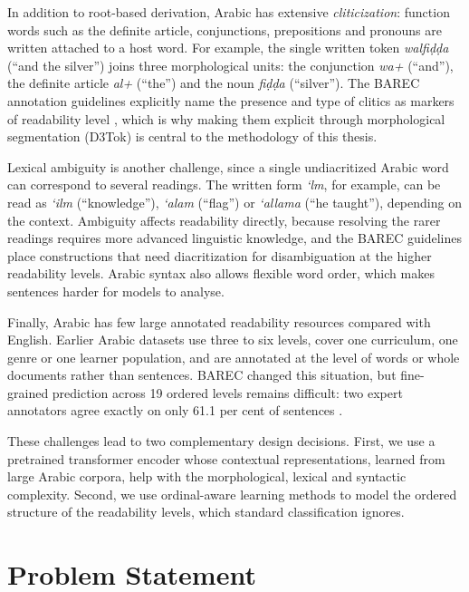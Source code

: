 In addition to root-based derivation, Arabic has extensive \emph{cliticization}: function words
such as the definite article, conjunctions, prepositions and pronouns are written attached to a
host word. For example, the single written token \textit{walfi\d{d}\d{d}a} (``and the silver'')
joins three morphological units: the conjunction \textit{wa+} (``and''), the definite article
\textit{al+} (``the'') and the noun \textit{fi\d{d}\d{d}a} (``silver''). The BAREC annotation
guidelines explicitly name the presence and type of clitics as markers of readability level
\cite{habash2025guidelines}, which is why making them explicit through morphological
segmentation (D3Tok) is central to the methodology of this thesis.

Lexical ambiguity is another challenge, since a single undiacritized Arabic word can correspond
to several readings. The written form \textit{`lm}, for example, can be read as \textit{`ilm}
(``knowledge''), \textit{`alam} (``flag'') or \textit{`allama} (``he taught''), depending on
the context. Ambiguity affects readability directly, because resolving the rarer readings
requires more advanced linguistic knowledge, and the BAREC guidelines place constructions that
need diacritization for disambiguation at the higher readability levels. Arabic syntax also
allows flexible word order, which makes sentences harder for models to analyse.

Finally, Arabic has few large annotated readability resources compared with English. Earlier
Arabic datasets use three to six levels, cover one curriculum, one genre or one learner
population, and are annotated at the level of words or whole documents rather than sentences.
BAREC changed this situation, but fine-grained prediction across 19 ordered levels remains
difficult: two expert annotators agree exactly on only 61.1 per cent of sentences
\cite{elmadani2025barec}.

These challenges lead to two complementary design decisions. First, we use a pretrained
transformer encoder whose contextual representations, learned from large Arabic corpora, help
with the morphological, lexical and syntactic complexity. Second, we use ordinal-aware learning
methods to model the ordered structure of the readability levels, which standard classification
ignores.

\section{Problem Statement}

